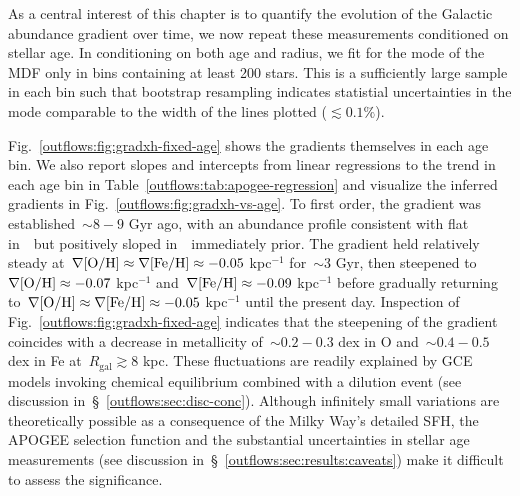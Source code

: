 As a central interest of this chapter is to quantify the evolution of the
Galactic abundance gradient over time, we now repeat these measurements
conditioned on stellar age.
In conditioning on both age and radius, we fit for the mode of the MDF only in
bins containing at least 200 stars.
This is a sufficiently large sample in each bin such that bootstrap resampling
indicates statistial uncertainties in the mode comparable to the width of the
lines plotted ($\lesssim0.1\%$).
\par
Fig.~\ref{outflows:fig:gradxh-fixed-age} shows the gradients themselves in each
age bin.
We also report slopes and intercepts from linear regressions to the trend in
each age bin in Table~\ref{outflows:tab:apogee-regression} and visualize the
inferred gradients in Fig.~\ref{outflows:fig:gradxh-vs-age}.
To first order, the gradient was established~$\sim$$8 - 9$ Gyr ago, with an
abundance profile consistent with flat in~\oh~but positively sloped
in~\feh~immediately prior.
The gradient held relatively steady at~$\nabla\text{[O/H]} \approx \nabla\text{[Fe/H]} \approx
-0.05$ kpc$^{-1}$ for~$\sim$3 Gyr, then steepened to~$\nabla\text{[O/H]} \approx -0.07$
kpc$^{-1}$ and~$\nabla\text{[Fe/H]} \approx -0.09$ kpc$^{-1}$ before gradually returning
to~$\nabla\text{[O/H]} \approx \nabla\text{[Fe/H]} \approx -0.05$ kpc$^{-1}$ until the present day.
Inspection of Fig.~\ref{outflows:fig:gradxh-fixed-age} indicates that the
steepening of the gradient coincides with a decrease in metallicity
of~$\sim$$0.2 - 0.3$ dex in O and~$\sim$$0.4 - 0.5$ dex in Fe
at~$R_\text{gal} \gtrsim$8 kpc.
These fluctuations are readily explained by GCE models invoking chemical
equilibrium combined with a dilution event (see discussion
in~\S~\ref{outflows:sec:disc-conc}).
Although infinitely small variations are theoretically possible as a
consequence of the Milky Way's detailed SFH, the APOGEE selection function and
the substantial uncertainties in stellar age measurements (see discussion
in~\S~\ref{outflows:sec:results:caveats}) make it difficult to assess the
significance.

